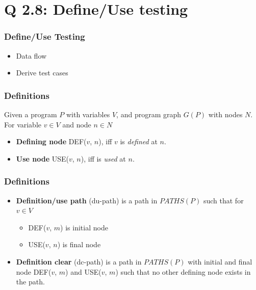
\section{Q 2.8: Define/Use testing}

\begin{frame}
    \frametitle{Define/Use Testing}
    \begin{itemize}
        \item Data flow
        \item Derive test cases
    \end{itemize}
\end{frame}

\begin{frame}
    \frametitle{Definitions}
    Given a program $P$ with variables $V$, and program graph $G(P)$ with nodes
    $N$.\\
    For variable $v \in V$ and node $n \in N$
    \begin{itemize}
        \item \textbf{Defining node} DEF($v$, $n$), iff $v$ is
            \emph{defined} at $n$.
        \item \textbf{Use node} USE($v$, $n$), iff is \emph{used} at $n$.
    \end{itemize}
\end{frame}

\begin{frame}
    \frametitle{Definitions}
    \begin{itemize}
        \item \textbf{Definition/use path} (du-path) is a path in $PATHS(P)$
            such that for $v \in V$
            \begin{itemize}
                \item DEF($v$, $m$) is initial node
                \item USE($v$, $n$) is final node
            \end{itemize}
        \item \textbf{Definition clear} (dc-path) is a path in $PATHS(P)$ with
            initial and final node DEF($v$, $m$) and USE($v$, $m$) such that no
            other defining node exists in the path.
    \end{itemize}
\end{frame}


